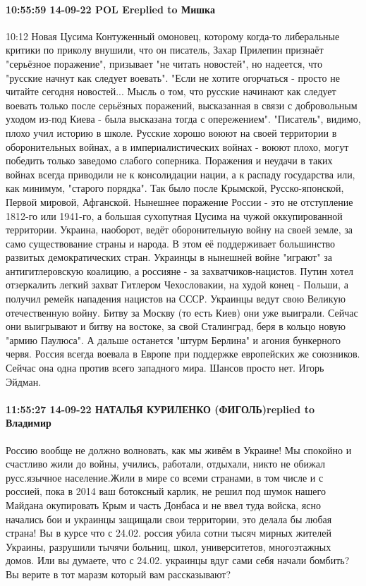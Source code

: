 \paragraph{10:55:59 14-09-22 POL Ereplied to Мишка}
10:12
Новая Цусима
Контуженный омоновец, которому когда-то либеральные критики по приколу внушили, что он писатель, Захар Прилепин признаёт "серьёзное поражение", призывает "не читать новостей", но надеется, что "русские начнут как следует воевать".
"Если не хотите огорчаться - просто не читайте сегодня новостей...
Мысль о том, что русские начинают как следует воевать только после серьёзных поражений, высказанная в связи с добровольным уходом из-под Киева - была высказана тогда с опережением".
"Писатель", видимо, плохо учил историю в школе. Русские хорошо воюют на своей территории в оборонительных войнах, а в империалистических войнах - воюют плохо, могут победить только заведомо слабого соперника. Поражения и неудачи в таких войнах всегда приводили не к консолидации нации, а к распаду государства или, как минимум, "старого порядка". Так было после Крымской, Русско-японской, Первой мировой, Афганской. Нынешнее поражение России - это не отступление 1812-го или 1941-го, а большая сухопутная Цусима на чужой оккупированной территории.
Украина, наоборот, ведёт оборонительную войну на своей земле, за само существование страны и народа. В этом её поддерживает большинство развитых демократических стран. Украинцы в нынешней войне "играют" за антигитлеровскую коалицию, а россияне - за захватчиков-нацистов.
Путин хотел отзеркалить легкий захват Гитлером Чехословакии, на худой конец - Польши, а получил ремейк нападения нацистов на СССР. Украинцы ведут свою Великую отечественную войну. Битву за Москву (то есть Киев) они уже выиграли. Сейчас они выигрывают и битву на востоке, за свой Сталинград, беря в кольцо новую "армию Паулюса". А дальше останется "штурм Берлина" и агония бункерного червя.
Россия всегда воевала в Европе при поддержке европейских же союзников. Сейчас она одна против всего западного мира. Шансов просто нет.
Игорь Эйдман.

\paragraph{11:55:27 14-09-22 НАТАЛЬЯ КУРИЛЕНКО (ФИГОЛЬ)replied to Владимир}

Россию вообще не должно волновать, как мы живём в Украине!
Мы спокойно и счастливо жили до войны, учились, работали, отдыхали, никто не обижал русс.язычное население.Жили в мире со всеми странами, в том числе и с россией, пока в 2014 ваш ботоксный карлик, не решил под шумок нашего Майдана окупировать Крым и часть Донбаса и не ввел туда войска, ясно начались бои и украинцы защищали свои территории, это делала бы любая страна!
Вы в курсе что с 24.02. россия убила сотни тысяч мирных жителей Украины, разрушили тычячи больниц, школ, университетов, многоэтажных домов. Или вы думаете, что с 24.02. украинцы вдуг сами себя начали бомбить?
Вы верите в тот маразм который вам рассказывают?

